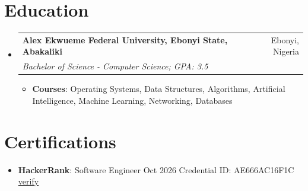 \documentclass[a4paper, 20pt]{article}
\makeatletter
\newcommand{\resumeItem}[2]{ \item\small{ \textbf{#1}{: #2} } }
\newcommand{\resumeSubheading}[4]{
\vspace{-1pt}
\item[]
\begin{tabular*}{0.97\textwidth}{l@{\extracolsep{\fill}}r}
	\textbf{#1} & #2          \\
	\textit{#3} & \textit{#4} \\
\end{tabular*}
\vspace{1pt}
}
\newcommand{\resumeSubItem}[2]{\resumeItem{#1}{#2}
\vspace{-3pt}}
\newcommand{\resumeSubHeadingListStart}{\begin{itemize}[leftmargin=*,topsep=4pt]}
\newcommand{\resumeSubHeadingListEnd}{\end{itemize}}
\newcommand{\resumeItemListStart}{\begin{itemize}[topsep=0pt,itemsep=0pt,parsep=0pt]}
\newcommand{\resumeItemListEnd}{\end{itemize}}
\makeatother
\begin{document}
	\vspace{-5pt}
	\section{Education}
	\resumeSubHeadingListStart
	\resumeSubheading
	{Alex Ekwueme Federal University, Ebonyi State, Abakaliki}{Ebonyi, Nigeria}
	{Bachelor of Science - Computer Science; GPA: 3.5}{}
	\resumeItemListStart
	\resumeItem{Courses}{Operating Systems, Data Structures, Algorithms, Artificial Intelligence, Machine Learning, Networking, Databases}
	\resumeItemListEnd
	\resumeSubHeadingListEnd

	\vspace{-5pt}
	\section{Certifications}
	\resumeSubHeadingListStart
	\resumeSubItem{HackerRank}{Software Engineer \textbullet{} Oct 2026 \textbullet{} Credential ID: AE666AC16F1C \textbullet{} \href{https://www.hackerrank.com/certificates/e4382188f72a}{verify}}
	\resumeSubHeadingListEnd
\end{document}
